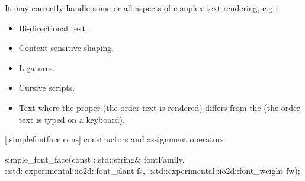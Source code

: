 \pnum
It may correctly handle some or all aspects of complex text rendering, e.g.:
\begin{itemize}
	\item Bi-directional text.
	\item Context sensitive shaping.
	\item Ligatures.
	\item Cursive scripts.
	\item Text where the proper  (the order text is rendered) differs from the  (the order text is typed on a keyboard).
\end{itemize}

 [\iotwod.simplefontface.cons] { constructors and 
assignment operators}

\begin{itemdecl}
simple_font_face(const ::std::string& fontFamily,
  ::std::experimental::io2d::font_slant fs,
  ::std::experimental::io2d::font_weight fw);
\end{itemdecl}
